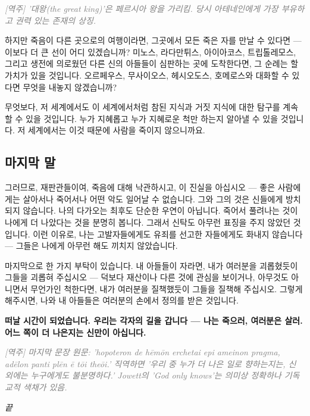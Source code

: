 \documentclass[11pt, a4paper]{article}
\newcommand{\tnote}[1]{\par\noindent\textit{\textcolor{gray}{[역주] #1}}\par\smallskip}
\begin{document}
\tnote{'대왕(the great king)'은 페르시아 왕을 가리킴. 당시 아테네인에게 가장 부유하고 권력 있는 존재의 상징.}


하지만 죽음이 다른 곳으로의 여행이라면, 그곳에서 모든 죽은 자를 만날 수 있다면 — 이보다 더 큰 선이 어디 있겠습니까? 미노스, 라다만튀스, 아이아코스, 트립톨레모스, 그리고 생전에 의로웠던 다른 신의 아들들이 심판하는 곳에 도착한다면, 그 순례는 할 가치가 있을 것입니다. 오르페우스, 무사이오스, 헤시오도스, 호메로스와 대화할 수 있다면 무엇을 내놓지 않겠습니까?


무엇보다, 저 세계에서도 이 세계에서처럼 참된 지식과 거짓 지식에 대한 탐구를 계속할 수 있을 것입니다. 누가 지혜롭고 누가 지혜로운 척만 하는지 알아낼 수 있을 것입니다. 저 세계에서는 이것 때문에 사람을 죽이지 않으니까요.


\bigskip


\subsection{마지막 말}


그러므로, 재판관들이여, 죽음에 대해 낙관하시고, 이 진실을 아십시오 — 좋은 사람에게는 살아서나 죽어서나 어떤 악도 일어날 수 없습니다. 그와 그의 것은 신들에게 방치되지 않습니다. 나의 다가오는 최후도 단순한 우연이 아닙니다. 죽어서 풀려나는 것이 나에게 더 나았다는 것을 분명히 봅니다. 그래서 신탁도 아무런 표징을 주지 않았던 것입니다. 이런 이유로, 나는 고발자들에게도 유죄를 선고한 자들에게도 화내지 않습니다 — 그들은 나에게 아무런 해도 끼치지 않았습니다.


마지막으로 한 가지 부탁이 있습니다. 내 아들들이 자라면, 내가 여러분을 괴롭혔듯이 그들을 괴롭혀 주십시오 — 덕보다 재산이나 다른 것에 관심을 보이거나, 아무것도 아니면서 무언가인 척한다면, 내가 여러분을 질책했듯이 그들을 질책해 주십시오. 그렇게 해주시면, 나와 내 아들들은 여러분의 손에서 정의를 받은 것입니다.


\textbf{떠날 시간이 되었습니다. 우리는 각자의 길을 갑니다 — 나는 죽으러, 여러분은 살러. 어느 쪽이 더 나은지는 신만이 아십니다.}


\tnote{마지막 문장 원문: 'hopoteron de hēmōn erchetai epi ameinon pragma, adēlon panti plēn ē tōi theōi.' 직역하면 '우리 중 누가 더 나은 일로 향하는지는, 신 외에는 누구에게도 불분명하다.' Jowett의 'God only knows'는 의미상 정확하나 기독교적 색채가 있음.}


\bigskip


\begin{center}\textit{끝}\end{center}
\end{document}
